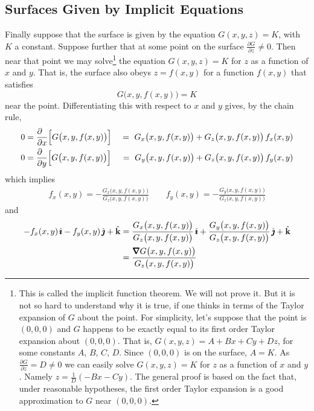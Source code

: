 \subsection{Surfaces Given by Implicit Equations}
Finally suppose that the surface is given by the equation
$G(x,y,z)=K$, with $K$ a constant. Suppose further that at some point 
on the surface $\frac{\partial G}{\partial z} \ne 0$. Then near that point 
we may solve\footnote{This is called the implicit function theorem. We 
will not prove it. But it is not so hard to understand why it is true, if one thinks in terms of the Taylor expansion of
$G$ about the point. For simplicity, let's suppose that the point is
$(0,0,0)$ and $G$ happens to be exactly equal to its first order 
Taylor expansion about $(0,0,0)$. That is, $G(x,y,z) = A +Bx +Cy +Dz$,
for some constants $A$, $B$, $C$, $D$. Since $(0,0,0)$ is on the surface,
$A=K$. As $\frac{\partial G}{\partial z}=D \ne 0$  we can easily solve
$G(x,y,z)=K$ for $z$ as a function of $x$ and $y$. Namely
$z=\frac{1}{D}(-Bx-Cy)$. The general proof is based on the fact that,
under reasonable hypotheses, the first order Taylor expansion is a 
good approximation to $G$ near $(0,0,0)$.} 
the equation $G(x,y,z)=K$ for $z$ as a function of $x$ and $y$. That is, the surface also obeys $z=f(x,y)$ for a function $f(x,y)$
that satisfies 
\begin{equation*}
G\big(x,y,f(x,y)\big) = K
\end{equation*}
near the point.
Differentiating this with respect to $x$ and $y$ gives, by the chain rule,
\begin{alignat*}{3}
0&=\frac{\partial\hfill}{\partial x}\Big[G\big(x,y,f(x,y)\big)\Big]
 &\ =\ G_x\big(x,y,f(x,y)\big) + G_z\big(x,y,f(x,y)\big)\,f_x(x,y) \\ 
0&=\frac{\partial\hfill}{\partial y}\Big[G\big(x,y,f(x,y)\big)\Big]
 &\ =\ G_y\big(x,y,f(x,y)\big) + G_z\big(x,y,f(x,y)\big)\,f_y(x,y)
\end{alignat*}
which implies
\begin{align*}
f_x(x,y) = -\frac{G_x\big(x,y,f(x,y)\big)}{G_z\big(x,y,f(x,y)\big)}
\qquad
f_y(x,y) = -\frac{G_y\big(x,y,f(x,y)\big)}{G_z\big(x,y,f(x,y)\big)}
\end{align*}
and
\begin{align*}
-f_x(x,y)\,\hi - f_y(x,y)\,\hj + \hk
&=\frac{G_x\big(x,y,f(x,y)\big)}{G_z\big(x,y,f(x,y)\big)}\,\hi+
\frac{G_y\big(x,y,f(x,y)\big)}{G_z\big(x,y,f(x,y)\big)}\,\hj+\hk \\
&=\frac{\vnabla G\big(x,y,f(x,y)\big)}{G_z\big(x,y,f(x,y)\big)}
\end{align*}
